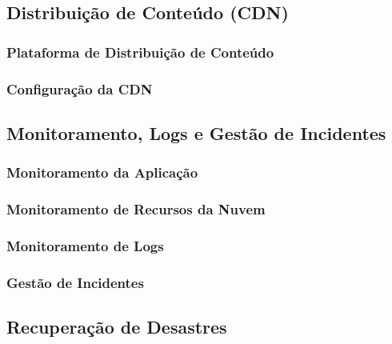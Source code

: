 \subsection{Distribuição de Conteúdo (CDN)}

\subsubsection{Plataforma de Distribuição de Conteúdo}

\subsubsection{Configuração da CDN}

\subsection{Monitoramento, Logs e Gestão de Incidentes}

\subsubsection{Monitoramento da Aplicação}

\subsubsection{Monitoramento de Recursos da Nuvem}

\subsubsection{Monitoramento de Logs}

\subsubsection{Gestão de Incidentes}

\subsection{Recuperação de Desastres}


